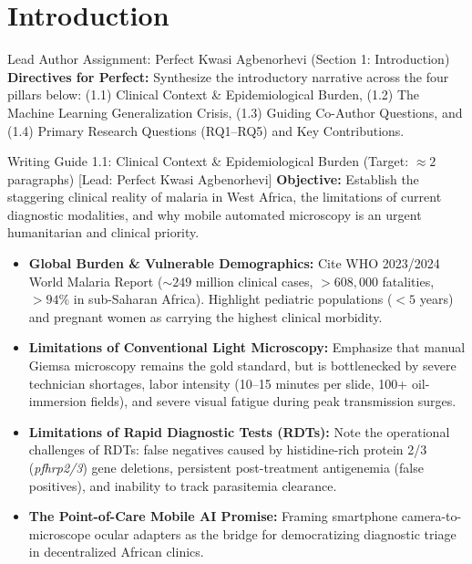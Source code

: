\documentclass[a4paper,11pt]{article}
\begin{document}
\begin{abstract}
\noindent
\textbf{Conclusion:} Zero-shot deployment of out-of-region malaria AI models in West African clinics poses critical safety risks through unacceptable false-negative rates. Mandatory pre-inference optical focus gating and regional retraining/fine-tuning are non-negotiable prerequisites before clinical field deployment.
\end{abstract}

\vspace{1.2em}

\section{Introduction}
\label{sec:intro}

\begin{guidebox}{Lead Author Assignment: Perfect Kwasi Agbenorhevi (Section 1: Introduction)}
\textbf{Directives for Perfect:} Synthesize the introductory narrative across the four pillars below: (1.1) Clinical Context \& Epidemiological Burden, (1.2) The Machine Learning Generalization Crisis, (1.3) Guiding Co-Author Questions, and (1.4) Primary Research Questions (RQ1--RQ5) and Key Contributions.
\end{guidebox}

\vspace{0.4em}

\begin{guidebox}{Writing Guide 1.1: Clinical Context \& Epidemiological Burden (Target: $\approx 2$ paragraphs) [Lead: Perfect Kwasi Agbenorhevi]}
\textbf{Objective:} Establish the staggering clinical reality of malaria in West Africa, the limitations of current diagnostic modalities, and why mobile automated microscopy is an urgent humanitarian and clinical priority.
\begin{itemize}\itemsep1.5pt
    \item \textbf{Global Burden \& Vulnerable Demographics:} Cite WHO 2023/2024 World Malaria Report ($\sim 249$ million clinical cases, $>608,000$ fatalities, $>94\%$ in sub-Saharan Africa). Highlight pediatric populations ($<5$ years) and pregnant women as carrying the highest clinical morbidity.
    \item \textbf{Limitations of Conventional Light Microscopy:} Emphasize that manual Giemsa microscopy remains the gold standard, but is bottlenecked by severe technician shortages, labor intensity (10--15 minutes per slide, 100+ oil-immersion fields), and severe visual fatigue during peak transmission surges.
    \item \textbf{Limitations of Rapid Diagnostic Tests (RDTs):} Note the operational challenges of RDTs: false negatives caused by histidine-rich protein 2/3 (\textit{pfhrp2/3}) gene deletions, persistent post-treatment antigenemia (false positives), and inability to track parasitemia clearance.
    \item \textbf{The Point-of-Care Mobile AI Promise:} Framing smartphone camera-to-microscope ocular adapters as the bridge for democratizing diagnostic triage in decentralized African clinics.
\end{itemize}
\end{guidebox}
\end{document}
